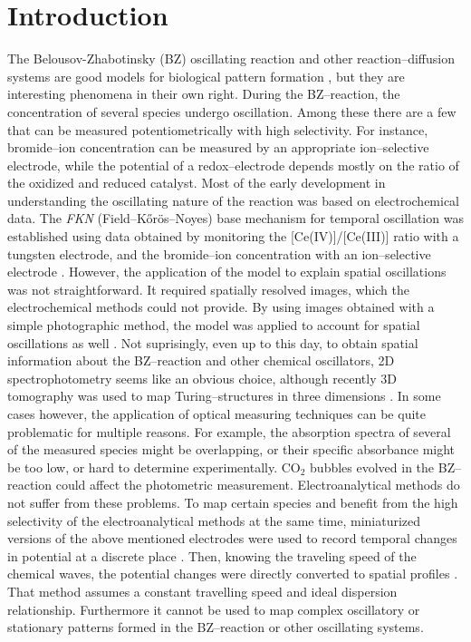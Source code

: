 \documentclass[3p, twocolumn]{elsarticle}
\begin{document}
\section{Introduction}
The Belousov-Zhabotinsky (BZ) oscillating reaction and other reaction--diffusion systems are good models for biological pattern formation \cite{kondo}, but they are interesting phenomena in their own right.
During the BZ--reaction, the concentration of several species undergo oscillation.
Among these there are a few that can be measured potentiometrically with high selectivity.
For instance, bromide--ion concentration can be measured by an appropriate ion--selective electrode, while the potential of a redox--electrode depends mostly on the ratio of the oxidized and reduced catalyst.
Most of the early development in understanding the oscillating nature of the reaction was based on electrochemical data.
The \emph{FKN} (Field--Kőrös--Noyes) base mechanism for temporal oscillation was established using data obtained by monitoring the [Ce(IV)]/[Ce(III)] ratio with a tungsten electrode, and the bromide--ion concentration with an ion--selective electrode \cite{fkn1, fkn2, fkn4}.
However, the application of the model to explain spatial oscillations was not straightforward.
It required spatially resolved images, which the electrochemical methods could not provide.
By using images obtained with a simple photographic method, the model was applied to account for spatial oscillations as well \cite{5}.
Not suprisingly, even up to this day, to obtain spatial information about the BZ--reaction and other chemical oscillators, 2D spectrophotometry seems like an obvious choice, although recently 3D tomography was used to map Turing--structures in three dimensions \cite{bansagi}.
In some cases however, the application of optical measuring techniques can be quite problematic for multiple reasons.
For example, the absorption spectra of several of the measured species might be overlapping, or their specific absorbance might be too low, or hard to determine experimentally.
CO$_2$ bubbles evolved in the BZ--reaction could affect the photometric measurement.
Electroanalytical methods do not suffer from these problems.
To map certain species and benefit from the high selectivity of the electroanalytical methods at the same time, miniaturized versions of the above mentioned electrodes were used to record temporal changes in potential at a discrete place \cite{hess2}.
Then, knowing the traveling speed of the chemical waves, the potential changes were directly converted to spatial profiles \cite{hess3}.
That method assumes a constant travelling speed and ideal dispersion relationship.
Furthermore it cannot be used to map complex oscillatory or stationary patterns formed in the BZ--reaction or other oscillating systems.
\end{document}

